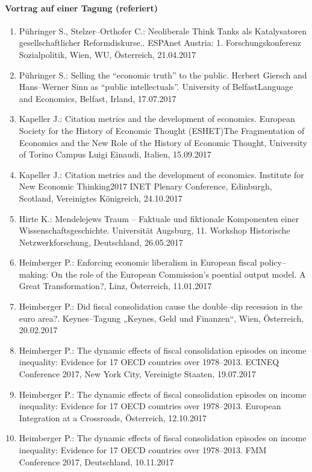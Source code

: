 \paragraph{Vortrag auf einer Tagung (referiert)}
\begin{enumerate}
	\item Pühringer S., Stelzer--Orthofer C.: Neoliberale Think Tanks als Katalysatoren gesellschaftlicher Reformdiskurse.. ESPAnet Austria: 1. Forschungskonferenz Sozialpolitik, Wien, WU, Österreich, 21.04.2017
	\item Pühringer S.: Selling the “economic truth” to the public. Herbert Giersch and Hans--Werner Sinn as “public intellectuals''. University of BelfastLanguage and Economics, Belfast, Irland, 17.07.2017
	\item Kapeller J.: Citation metrics and the development of economics. European Society for the History of Economic Thought (ESHET)The Fragmentation of Economics and the New Role of the History of Economic Thought, University of Torino Campus Luigi Einaudi, Italien, 15.09.2017
	\item Kapeller J.: Citation metrics and the development of economics. Institute for New Economic Thinking2017 INET Plenary Conference, Edinburgh, Scotland, Vereinigtes Königreich, 24.10.2017
	\item Hirte K.: Mendelejews Traum – Faktuale und fiktionale Komponenten einer Wissenschaftsgeschichte. Universität Augsburg, 11. Workshop Historische Netzwerkforschung, Deutschland, 26.05.2017
	\item Heimberger P.: Enforcing economic liberalism in European fiscal policy--making: On the role of the European Commission’s poential output model. A Great Transformation?, Linz, Österreich, 11.01.2017
	\item Heimberger P.: Did fiscal consolidation cause the double--dip recession in the euro area?. Keynes--Tagung „Keynes, Geld und Finanzen“, Wien, Österreich, 20.02.2017
	\item Heimberger P.: The dynamic effects of fiscal consolidation episodes on income inequality: Evidence for 17 OECD countries over 1978--2013. ECINEQ Conference 2017, New York City, Vereinigte Staaten, 19.07.2017
	\item Heimberger P.: The dynamic effects of fiscal consolidation episodes on income inequality: Evidence for 17 OECD countries over 1978--2013. European Integration at a Crossroads, Österreich, 12.10.2017
	\item Heimberger P.: The dynamic effects of fiscal consolidation episodes on income inequality: Evidence for 17 OECD countries over 1978--2013. FMM Conference 2017, Deutschland, 10.11.2017

\end{enumerate}
